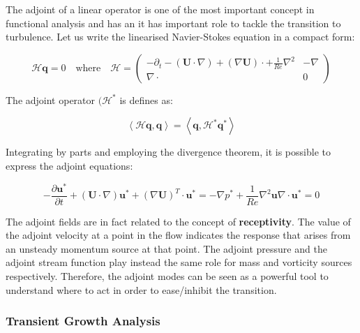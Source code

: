 The adjoint of a linear operator is one of the most important concept in functional analysis and has an it has important role to tackle the transition to turbulence. Let us write the linearised Navier-Stokes equation in a compact form:

\begin{equation}
\mathcal{H}\mathbf{q}=0 \quad \mbox{where} \quad \mathcal{H}=\left( \begin{array}{c|c}
  -\partial_t-(\mathbf{U} \cdot \nabla)+ (\nabla \mathbf{U}) \cdot + \frac{1}{Re} \nabla^2 & -\nabla \\
  \hline
  \nabla \cdot  & 0
   \end{array}
 \right)
 \end{equation}


The adjoint operator $(\mathcal{H}^*$ is defines as:

\begin{equation}
\left \langle \mathcal{H}\mathbf{q}, \mathbf{q} \right \rangle= \left \langle \mathbf{q}, \mathcal{H}^*\mathbf{q}^* \right \rangle
\end{equation}

Integrating by parts and employing the divergence theorem, it is possible to express the adjoint equations:

\begin{subequations}
\begin{equation}
-\frac{\partial \mathbf{u}^*}{\partial t}+(\mathbf{U} \cdot \nabla)\mathbf{u}^*+(\nabla \mathbf{U})^T \cdot \mathbf{u}^*=-\nabla p^*+\frac{1}{Re} \nabla^2 \mathbf{u}
\end{equation}

\begin{equation}
\nabla \cdot \mathbf{u}^*=0
\end{equation}
\end{subequations}

The adjoint fields are in fact related to the concept of \textbf{receptivity}. The value of the adjoint velocity at a point in the flow indicates the response that arises from an unsteady momentum source at that point. The adjoint pressure and the adjoint stream function play instead the same role for mass and vorticity sources respectively. Therefore, the adjoint modes can be seen as a powerful tool to understand where to act in order to ease/inhibit the transition.

\subsubsection{Transient Growth Analysis}

